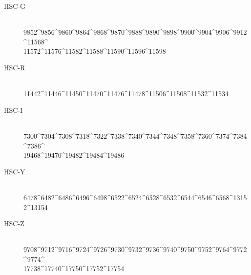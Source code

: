 \documentclass[DM,obsolete,STS,toc]{lsstdoc}
\begin{document}
\begin{description}

\item[HSC-G]{\hfill \\ 9852\^{}9856\^{}9860\^{}9864\^{}9868\^{}9870\^{}9888\^{}9890\^{}9898\^{}9900\^{}9904\^{}9906\^{}9912\^{}11568\^{}\\11572\^{}11576\^{}11582\^{}11588\^{}11590\^{}11596\^{}11598}
\item[HSC-R]{\hfill \\ 11442\^{}11446\^{}11450\^{}11470\^{}11476\^{}11478\^{}11506\^{}11508\^{}11532\^{}11534}
\item[HSC-I]{\hfill \\ 7300\^{}7304\^{}7308\^{}7318\^{}7322\^{}7338\^{}7340\^{}7344\^{}7348\^{}7358\^{}7360\^{}7374\^{}7384\^{}7386\^{}\\19468\^{}19470\^{}19482\^{}19484\^{}19486}
\item[HSC-Y]{\hfill \\ 6478\^{}6482\^{}6486\^{}6496\^{}6498\^{}6522\^{}6524\^{}6528\^{}6532\^{}6544\^{}6546\^{}6568\^{}13152\^{}13154}
\item[HSC-Z]{\hfill \\ 9708\^{}9712\^{}9716\^{}9724\^{}9726\^{}9730\^{}9732\^{}9736\^{}9740\^{}9750\^{}9752\^{}9764\^{}9772\^{}9774\^{}\\17738\^{}17740\^{}17750\^{}17752\^{}17754}

\end{description}
\end{document}
